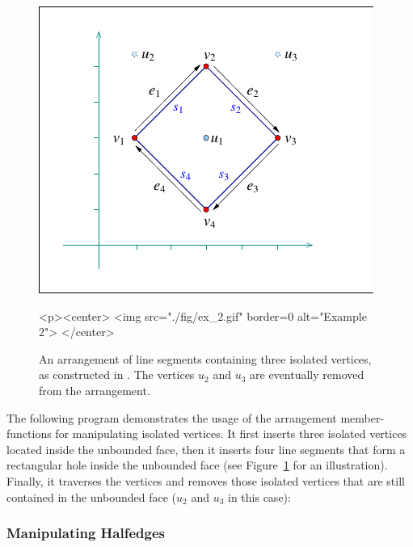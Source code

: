 \begin{figure}[t]
\begin{ccTexOnly}
  \begin{center}
  \includegraphics{Arrangement_2/fig/ex_2}
  \end{center}
\end{ccTexOnly}
\begin{ccHtmlOnly}
  <p><center>
  <img src="./fig/ex_2.gif" border=0 alt="Example 2">
  </center>
\end{ccHtmlOnly}
\caption{An arrangement of line segments containing three isolated
vertices, as constructed in . The vertices $u_2$
and $u_3$ are eventually removed from the arrangement.}
\label{arr_fig:ex_2}
\end{figure}

The following program demonstrates the usage of the arrangement
member-functions for manipulating isolated vertices. It first
inserts three isolated vertices located inside the unbounded face, then
it inserts four line segments that form a rectangular hole inside the
unbounded face (see Figure~\ref{arr_fig:ex_2} for an
illustration). Finally, it traverses the vertices and removes those
isolated vertices that are still contained in the unbounded face
($u_2$ and $u_3$ in this case):


\subsubsection{Manipulating Halfedges}
\label{arr_sssec:mf_halfedges}


